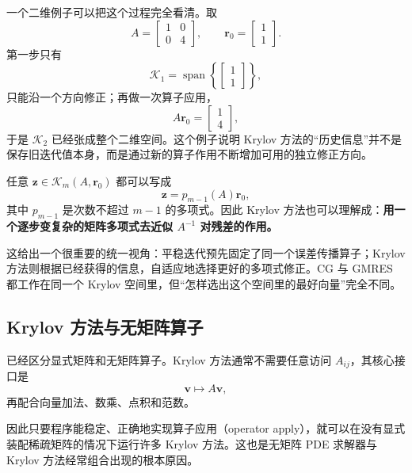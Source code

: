 一个二维例子可以把这个过程完全看清。取
\begin{equation}
A=
\begin{bmatrix}
1&0\\
0&4
\end{bmatrix},
\qquad
\bm r_0=
\begin{bmatrix}
1\\1
\end{bmatrix}.
\end{equation}
第一步只有
\begin{equation}
\mathcal K_1=\operatorname{span}
\left\{
\begin{bmatrix}1\\1\end{bmatrix}
\right\},
\end{equation}
只能沿一个方向修正；再做一次算子应用，
\begin{equation}
A\bm r_0=
\begin{bmatrix}
1\\4
\end{bmatrix},
\end{equation}
于是 $\mathcal K_2$ 已经张成整个二维空间。这个例子说明 Krylov 方法的“历史信息”并不是保存旧迭代值本身，而是通过新的算子作用不断增加可用的独立修正方向。

任意 $\bm z\in\mathcal K_m(A,\bm r_0)$ 都可以写成
\begin{equation}
\bm z
=
p_{m-1}(A)\bm r_0,
\end{equation}
其中 $p_{m-1}$ 是次数不超过 $m-1$ 的多项式。因此 Krylov 方法也可以理解成：\textbf{用一个逐步变复杂的矩阵多项式去近似 $A^{-1}$ 对残差的作用。}

这给出一个很重要的统一视角：平稳迭代预先固定了同一个误差传播算子；Krylov 方法则根据已经获得的信息，自适应地选择更好的多项式修正。CG 与 GMRES 都工作在同一个 Krylov 空间里，但“怎样选出这个空间里的最好向量”完全不同。

\subsection{Krylov 方法与无矩阵算子}

已经区分显式矩阵和无矩阵算子。Krylov 方法通常不需要任意访问 $A_{ij}$，其核心接口是
\begin{equation}
\bm v
\longmapsto
A\bm v,
\end{equation}
再配合向量加法、数乘、点积和范数。

因此只要程序能稳定、正确地实现算子应用（operator apply），就可以在没有显式装配稀疏矩阵的情况下运行许多 Krylov 方法。这也是无矩阵 PDE 求解器与 Krylov 方法经常组合出现的根本原因。

